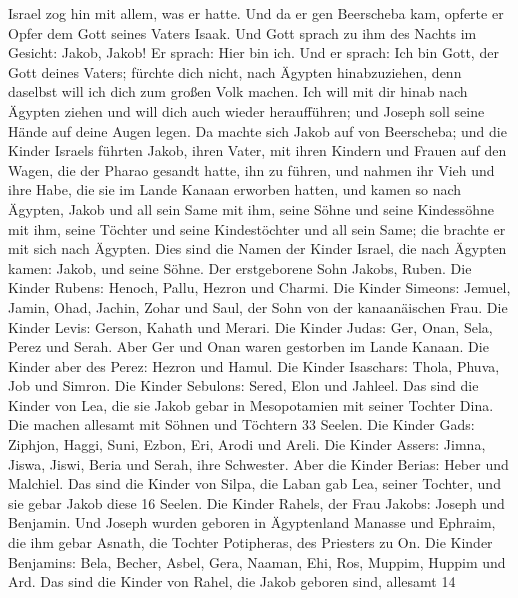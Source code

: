  Israel zog hin mit allem, was er hatte. Und da er gen
Beerscheba kam, opferte er Opfer dem Gott seines Vaters Isaak.
 Und Gott sprach zu ihm des Nachts im Gesicht: Jakob,
Jakob! Er sprach: Hier bin ich.  Und er sprach: Ich bin
Gott, der Gott deines Vaters; fürchte dich nicht, nach Ägypten
hinabzuziehen, denn daselbst will ich dich zum großen Volk machen.
 Ich will mit dir hinab nach Ägypten ziehen und will dich
auch wieder heraufführen; und Joseph soll seine Hände auf deine Augen
legen.  Da machte sich Jakob auf von Beerscheba; und die
Kinder Israels führten Jakob, ihren Vater, mit ihren Kindern und Frauen
auf den Wagen, die der Pharao gesandt hatte, ihn zu führen,
 und nahmen ihr Vieh und ihre Habe, die sie im Lande
Kanaan erworben hatten, und kamen so nach Ägypten, Jakob und all sein
Same mit ihm,  seine Söhne und seine Kindessöhne mit ihm,
seine Töchter und seine Kindestöchter und all sein Same; die brachte er
mit sich nach Ägypten.  Dies sind die Namen der Kinder
Israel, die nach Ägypten kamen: Jakob, und seine Söhne. Der erstgeborene
Sohn Jakobs, Ruben.  Die Kinder Rubens: Henoch, Pallu,
Hezron und Charmi.  Die Kinder Simeons: Jemuel, Jamin,
Ohad, Jachin, Zohar und Saul, der Sohn von der kanaanäischen Frau.
 Die Kinder Levis: Gerson, Kahath und Merari.
 Die Kinder Judas: Ger, Onan, Sela, Perez und Serah. Aber
Ger und Onan waren gestorben im Lande Kanaan. Die Kinder aber des Perez:
Hezron und Hamul.  Die Kinder Isaschars: Thola, Phuva,
Job und Simron.  Die Kinder Sebulons: Sered, Elon und
Jahleel.  Das sind die Kinder von Lea, die sie Jakob
gebar in Mesopotamien mit seiner Tochter Dina. Die machen allesamt mit
Söhnen und Töchtern 33 Seelen.  Die Kinder Gads: Ziphjon,
Haggi, Suni, Ezbon, Eri, Arodi und Areli.  Die Kinder
Assers: Jimna, Jiswa, Jiswi, Beria und Serah, ihre Schwester. Aber die
Kinder Berias: Heber und Malchiel.  Das sind die Kinder
von Silpa, die Laban gab Lea, seiner Tochter, und sie gebar Jakob diese
16 Seelen.  Die Kinder Rahels, der Frau Jakobs: Joseph
und Benjamin.  Und Joseph wurden geboren in Ägyptenland
Manasse und Ephraim, die ihm gebar Asnath, die Tochter Potipheras, des
Priesters zu On.  Die Kinder Benjamins: Bela, Becher,
Asbel, Gera, Naaman, Ehi, Ros, Muppim, Huppim und Ard. 
Das sind die Kinder von Rahel, die Jakob geboren sind, allesamt 14
